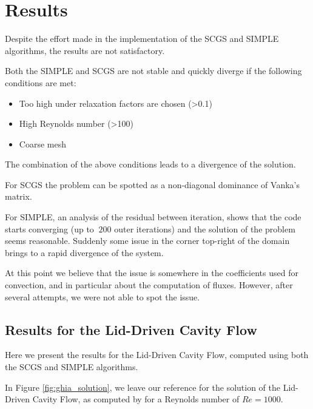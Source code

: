 \section{Results}
\label{sec:results}

Despite the effort made in the implementation of the SCGS and SIMPLE algorithms, the results are not satisfactory.

Both the SIMPLE and SCGS are not stable and quickly diverge if the following conditions are met:

\begin{itemize}
    \item Too high under relaxation factors are chosen (>0.1)
    \item High Reynolds number (>100)
    \item Coarse mesh
\end{itemize}

The combination of the above conditions leads to a divergence of the solution.

For SCGS the problem can be spotted as a non-diagonal dominance of Vanka's matrix.

For SIMPLE, an analysis of the residual between iteration, shows that the code starts converging (up to $~200$ outer iterations) and the solution of the problem seems reasonable.
Suddenly some issue in the corner top-right of the domain brings to a rapid divergence of the system.

At this point we believe that the issue is somewhere in the coefficients used for convection, and in particular about the computation of fluxes.
However, after several attempts, we were not able to spot the issue.


\subsection{Results for the Lid-Driven Cavity Flow}

Here we present the results for the Lid-Driven Cavity Flow, computed using both the SCGS and SIMPLE algorithms.

In Figure \ref{fig:ghia_solution}, we leave our reference for the solution of the Lid-Driven Cavity Flow, as computed by \cite{Ghia1982HighReSF} for a Reynolds number of $Re=1000$.

